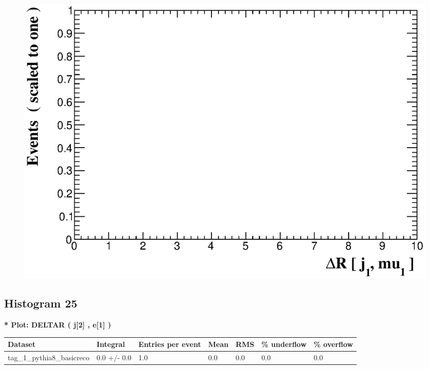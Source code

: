 \documentclass[a4paper, 10pt]{article}
\begin{document}
\begin{figure}[H]
  \begin{center}
    \includegraphics[scale=0.45]{selection_23.eps}\\
\caption{   }
  \end{center}
\end{figure}
      \newpage
\subsection{ Histogram 25}

\textbf{* Plot: DELTAR ( j[2] , e[1] ) }\\
   \begin{table}[H]
  \begin{center}
    \begin{tabular}{|m{23.0mm}|m{23.0mm}|m{18.0mm}|m{19.0mm}|m{19.0mm}|m{19.0mm}|m{19.0mm}|}
      \hline
      {\cellcolor{yellow}         Dataset}& {\cellcolor{yellow}         Integral}& {\cellcolor{yellow}         Entries per event}& {\cellcolor{yellow}         Mean}& {\cellcolor{yellow}         RMS}& {\cellcolor{yellow}         \% underflow}& {\cellcolor{yellow}         \% overflow}\\
      \hline
      {\cellcolor{white}         tag\_1\_pythia8\_basicreco}& {\cellcolor{white}         0.0 +/\-- 0.0}& {\cellcolor{white}         1.0}& {\cellcolor{white}         0.0}& {\cellcolor{white}         0.0}& {\cellcolor{green}         0.0}& {\cellcolor{green}         0.0}\\
\hline
    \end{tabular}
  \end{center}
\end{table}
\end{document}
